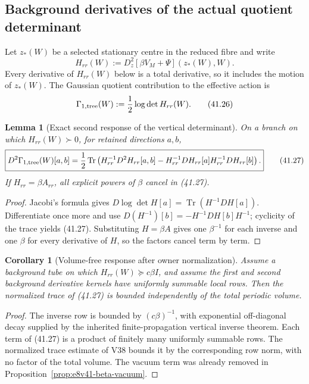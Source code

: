 \documentclass[11pt,oneside]{book}
\newtheorem{lemma}[theorem]{Lemma}
\newtheorem{corollary}[theorem]{Corollary}
\theoremstyle{definition}
\theoremstyle{remark}
\newcommand{\Tr}{\operatorname{Tr}}
\begin{document}
\subsection{Background derivatives of the actual quotient determinant}

Let \(z_*(W)\) be a selected stationary centre in the reduced fibre
and write
\[
 H_{rr}(W)
 :=D_z^2[\beta V_M+\Psi](z_*(W),W).                             \tag{41.25}
\]
Every derivative of \(H_{rr}(W)\) below is a total derivative, so it
includes the motion of \(z_*(W)\).  The Gaussian quotient
contribution to the effective action is
\[
 \Gamma_{1,{\rm tree}}(W):=\frac12\log\det H_{rr}(W).            \tag{41.26}
\]

\begin{lemma}[Exact second response of the vertical determinant]
\label{lem:e8v41-logdet-response}
On a branch on which \(H_{rr}(W)\succ0\), for retained directions
\(a,b\),
\[
 \boxed{
 D^2\Gamma_{1,{\rm tree}}(W)[a,b]
 =\frac12\Tr\left(
 H_{rr}^{-1}D^2H_{rr}[a,b]
 -H_{rr}^{-1}DH_{rr}[a]H_{rr}^{-1}DH_{rr}[b]
 \right).}                                                      \tag{41.27}
\]
If \(H_{rr}=\beta A_{rr}\), all explicit powers of \(\beta\)
cancel in (41.27).
\end{lemma}

\begin{proof}
Jacobi's formula gives
\(D\log\det H[a]=\Tr(H^{-1}DH[a])\).  Differentiate once more and
use
\(D(H^{-1})[b]=-H^{-1}DH[b]H^{-1}\); cyclicity of the trace yields
(41.27).  Substituting \(H=\beta A\) gives one \(\beta^{-1}\) for
each inverse and one \(\beta\) for every derivative of \(H\), so
the factors cancel term by term.
\end{proof}

\begin{corollary}[Volume-free response after owner normalization]
\label{cor:e8v41-volume-free-logdet}
Assume a background tube on which
\(H_{rr}(W)\succeq c\beta I\), and assume the first and second
background derivative kernels have uniformly summable local rows.
Then the normalized trace of (41.27) is bounded independently of
the total periodic volume.
\end{corollary}

\begin{proof}
The inverse row is bounded by \((c\beta)^{-1}\), with exponential
off-diagonal decay supplied by the inherited finite-propagation
vertical inverse theorem.  Each term of (41.27) is a product of
finitely many uniformly summable rows.  The normalized trace estimate
of V38 bounds it by the corresponding row norm, with no factor of the
total volume.  The vacuum term was already removed in
Proposition~\ref{prop:e8v41-beta-vacuum}.
\end{proof}
\end{document}
